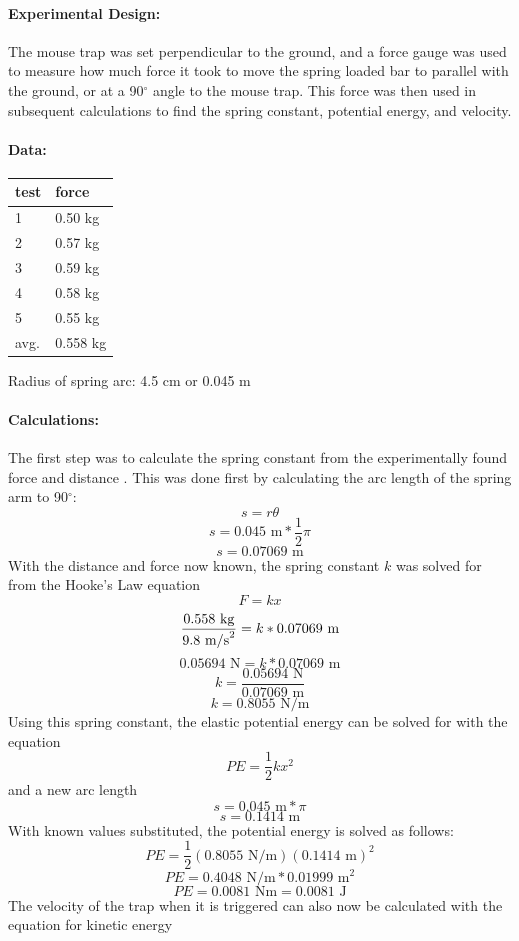 \documentclass[12pt]{article}
\begin{document}
	\paragraph{Experimental Design:} The mouse trap was set perpendicular to the ground, and a force gauge was used to measure how much force it took to move the spring loaded bar to parallel with the ground, or at a 90$^{\circ}$ angle to the mouse trap. This force was then used in subsequent calculations to find the spring constant, potential energy, and velocity.
	\paragraph{Data:}
	\begin{flushleft}
	\begin{tabular}{ l|l }
		test & force \\
		\hline
		1 & 0.50 kg \\
		2 & 0.57 kg \\
		3 & 0.59 kg \\
		4 & 0.58 kg \\
		5 & 0.55 kg \\
		avg. & 0.558 kg \\
	\end{tabular}
	\end{flushleft}
	Radius of spring arc: 4.5 cm or 0.045 m
	\paragraph{Calculations:} The first step was to calculate the spring constant from the experimentally found force and distance . This was done first by calculating the arc length of the spring arm to 90$^{\circ}$:
	\begin{equation}
		s = r\theta
	\end{equation}
	$$ s = 0.045 \text{ m} * \frac{1}{2}\pi $$
	$$ s = 0.07069 \text{ m} $$
	With the distance and force now known, the spring constant $k$ was solved for from the Hooke's Law equation
	\begin{equation}
		F = kx
	\end{equation}
	$$ \frac{0.558 \text{ kg}}{9.8 \text{ m/s}^2} = \\
	k * 0.07069 \text{ m} $$
	$$ 0.05694 \text{ N} = k * 0.07069 \text{ m} $$
	$$ k = \frac{0.05694 \text{ N}}{0.07069 \text{ m}} $$
	$$ k = 0.8055 \text{ N/m} $$
	Using this spring constant, the elastic potential energy can be solved for with the equation
	\begin{equation}
		PE = \frac{1}{2}kx^2
	\end{equation}
	and a new arc length
	$$ s = 0.045 \text{ m} * \pi $$
	$$ s = 0.1414 \text{ m} $$
	With known values substituted, the potential energy is solved as follows:
	$$ PE = \frac{1}{2}(0.8055\text{ N/m})(0.1414\text{ m})^2 $$
	$$ PE = 0.4048\text{ N/m} * 0.01999\text{ m}^2 $$
	$$ PE = 0.0081\text{ Nm} = 0.0081\text{ J} $$
	The velocity of the trap when it is triggered can also now be calculated with the equation for kinetic energy 
	
\end{document}
